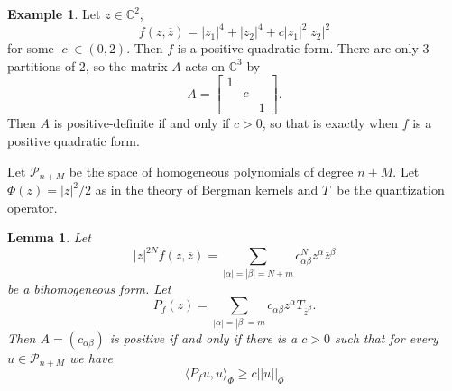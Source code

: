 \documentclass[12pt]{report}
\newcommand{\CC}{\mathbb{C}}
\newtheorem{lemma}[theorem]{Lemma}
\theoremstyle{definition}
\newtheorem{example}[theorem]{Example}
\begin{document}
\begin{example}
    Let $z \in \CC^2$,
    $$f(z, \overline z) = |z_1|^4 + |z_2|^4 + c|z_1|^2 |z_2|^2$$
    for some $|c| \in (0, 2)$. Then $f$ is a positive quadratic form. There are only $3$ partitions of $2$, so the matrix $A$ acts on $\CC^3$ by
    $$A = \begin{bmatrix}
        1 &&\\&c&\\&&1
    \end{bmatrix}.$$
    Then $A$ is positive-definite if and only if $c > 0$, so that is exactly when $f$ is a positive quadratic form.
\end{example}
    Let $\mathcal P_{n + M}$ be the space of homogeneous polynomials of degree $n + M$. Let $\Phi(z) = |z|^2/2$ as in the theory of Bergman kernels and $T_\cdot$ be the quantization operator.
\begin{lemma}
    Let
    $$|z|^{2N} f(z, \overline z) = \sum_{|\alpha| = |\beta| = N + m} c_{\alpha\beta}^N z^\alpha \overline z^\beta$$
    be a bihomogeneous form. Let
    $$P_f(z) = \sum_{|\alpha| = |\beta| = m} c_{\alpha\beta}z^\alpha T_{\overline z^\beta}.$$
    Then $A = (c_{\alpha\beta})$ is positive if and only if there is a $c > 0$ such that for every $u \in \mathcal P_{n + M}$ we have
    $$\langle P_f u, u\rangle_\Phi \geq c||u||_\Phi$$
\end{lemma}
\end{document}
